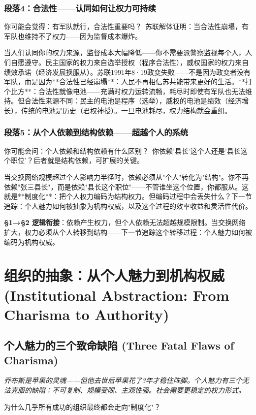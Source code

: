 \documentclass[a4paper,12pt]{book}
\newenvironment{motivation}{\begin{tcolorbox}[colback=gray!10,colframe=gray!60,title=\textit{动机}]\small\itshape}{\end{tcolorbox}}
\newenvironment{questionbox}{\begin{tcolorbox}[colback=red!3,colframe=red!60]}{\end{tcolorbox}}
\begin{document}
\begin{motivation}
\begin{motivation}
\begin{motivation}
	\subsubsection*{段落4：合法性——认同如何让权力可持续}

	\begin{tcolorbox}[colback=yellow!5, title=\textit{读者行为预测}]
		你可能会觉得：有军队就行，合法性重要吗？\ 苏联解体证明：当合法性崩塌，有军队也维持不了权力——因为监督成本爆炸。
	\end{tcolorbox}

当人们认同你的权力来源，监督成本大幅降低——你不需要派警察监视每个人，人们自愿遵守。民主国家的权力来自选举授权（程序合法性），威权国家的权力来自绩效承诺（经济发展换服从）。苏联1991年8·19政变失败——不是因为政变者没有军队，而是因为**合法性已经崩塌**：人民不再相信苏共能带来更好的生活。**打个比方**：合法性就像电池——充满时权力运转流畅，耗尽时即使有军队也无法维持。但合法性来源不同：民主的电池是程序（选举），威权的电池是绩效（经济增长），传统的电池是历史（君权神授）。一旦电池耗尽，权力结构就会重组。

	\subsubsection*{段落5：从个人依赖到结构依赖——超越个人的系统}

	\begin{tcolorbox}[colback=yellow!5, title=\textit{读者行为预测}]
		你可能会问：个人依赖和结构依赖有什么区别？\ 你依赖'县长'这个人还是'县长这个职位'？后者就是结构依赖，可扩展的关键。
	\end{tcolorbox}

当交换网络规模超过个人影响力半径时，依赖必须从"个人"转化为"结构"。你不再依赖"张三县长"，而是依赖"县长这个职位"——不管谁坐这个位置，你都服从。这就是**制度化**：把个人权力编码为结构权力。但编码过程中会丢失什么？下一节追踪：个人魅力如何被抽象为机构权威，以及这个过程的效率收益和灵活性代价。

	\textbf{§1→§2 逻辑衔接}：依赖产生权力，但个人依赖无法超越规模限制。当交换网络扩大，权力必须从个人转移到结构——下一节追踪这个转移过程：个人魅力如何被编码为机构权威。
	\section{组织的抽象：从个人魅力到机构权威 (Institutional Abstraction: From Charisma to Authority)}

	\subsection{个人魅力的三个致命缺陷 (Three Fatal Flaws of Charisma)}
	\begin{motivation}
		乔布斯是苹果的灵魂——但他去世后苹果花了3年才稳住阵脚。个人魅力有三个无法克服的缺陷：不可复制、规模受限、主观性强。社会需要更稳定的权力形式。
	\end{motivation}
	\begin{questionbox}
		为什么几乎所有成功的组织最终都会走向"制度化"？
	\end{questionbox}


\end{motivation}
\end{motivation}
\end{motivation}
\end{document}
